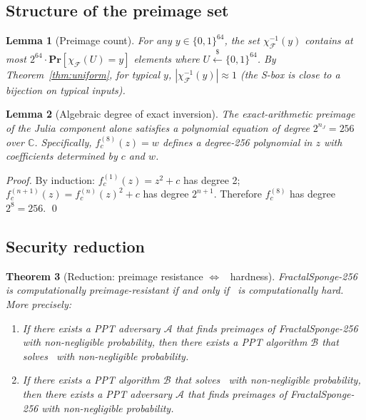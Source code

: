 \documentclass[11pt]{article}
\newtheorem{theorem}{Theorem}
\newtheorem{lemma}[theorem]{Lemma}
\theoremstyle{definition}
\theoremstyle{remark}
\newcommand{\sbox}{\chi_{\mathcal{F}}} %
\newcommand{\bits}{\{0,1\}}
\newcommand{\Pr}{\mathbf{Pr}}
\newcommand{\FIP}{\mathsf{FIP}}       %
\begin{document}
\subsection{Structure of the preimage set}

\begin{lemma}[Preimage count]
\label{lem:preimage}
For any $y \in \bits^{64}$, the set $\sbox^{-1}(y)$ contains at most
$2^{64} \cdot \Pr[\sbox(U) = y]$ elements where $U \xleftarrow{\$} \bits^{64}$.
By Theorem~\ref{thm:uniform}, for typical $y$, $|\sbox^{-1}(y)| \approx 1$
(the S-box is close to a bijection on typical inputs).
\end{lemma}

\begin{lemma}[Algebraic degree of exact inversion]
\label{lem:degree}
The exact-arithmetic preimage of the Julia component alone satisfies a
polynomial equation of degree $2^{n_J} = 256$ over $\mathbb{C}$. Specifically,
$f_c^{(8)}(z) = w$ defines a degree-256 polynomial in $z$ with coefficients
determined by $c$ and $w$.
\end{lemma}

\begin{proof}
By induction: $f_c^{(1)}(z) = z^2 + c$ has degree 2; $f_c^{(n+1)}(z) =
f_c^{(n)}(z)^2 + c$ has degree $2^{n+1}$. Therefore $f_c^{(8)}$ has degree
$2^8 = 256$.
\qed
\end{proof}

\subsection{Security reduction}
\label{sec:fip-hardness}

\begin{theorem}[Reduction: preimage resistance $\Leftrightarrow$ \FIP\ hardness]
\label{thm:reduction}
FractalSponge-256 is computationally preimage-resistant if and only if
\FIP\ is computationally hard. More precisely:

\begin{enumerate}
    \item If there exists a PPT adversary $\mathcal{A}$ that finds preimages
          of FractalSponge-256 with non-negligible probability, then there
          exists a PPT algorithm $\mathcal{B}$ that solves \FIP\ with
          non-negligible probability.

    \item If there exists a PPT algorithm $\mathcal{B}$ that solves \FIP\
          with non-negligible probability, then there exists a PPT adversary
          $\mathcal{A}$ that finds preimages of FractalSponge-256 with
          non-negligible probability.
\end{enumerate}
\end{theorem}
\end{document}
